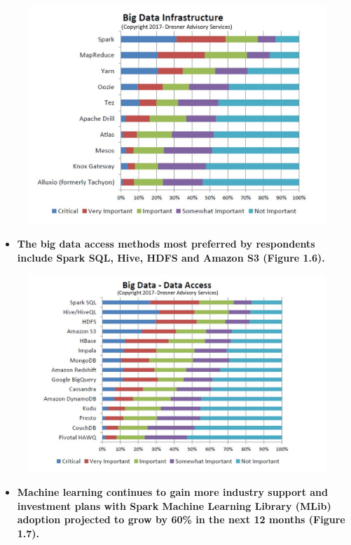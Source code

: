 \documentclass[]{book}
\providecommand{\tightlist}{%
  \setlength{\itemsep}{0pt}\setlength{\parskip}{0pt}}
\begin{document}
\begin{figure}
\centering
\includegraphics{5.jpg}
\caption{}
\end{figure}

\begin{itemize}
\tightlist
\item
  \textbf{The big data access methods most preferred by respondents
  include Spark SQL, Hive, HDFS and Amazon S3 (Figure 1.6).}
\end{itemize}

\begin{figure}
\centering
\includegraphics{6.jpg}
\caption{}
\end{figure}

\begin{itemize}
\tightlist
\item
  \textbf{Machine learning continues to gain more industry support and
  investment plans with Spark Machine Learning Library (MLib) adoption
  projected to grow by 60\% in the next 12 months (Figure 1.7).}
\end{itemize}
\end{document}
